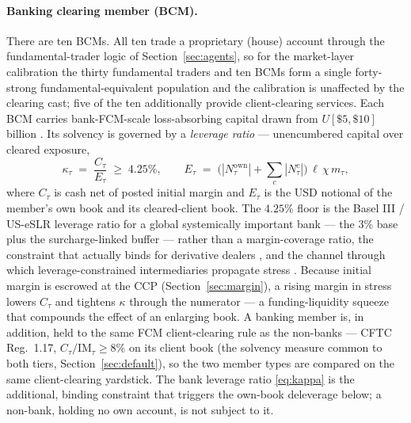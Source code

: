 \paragraph{Banking clearing member (BCM).}
There are ten BCMs. All ten trade a proprietary (house) account through the fundamental-trader
logic of Section~\ref{sec:agents}, so for the market-layer calibration the thirty fundamental
traders and ten BCMs form a single forty-strong fundamental-equivalent population and the
calibration is unaffected by the clearing cast; five of the ten additionally provide
client-clearing services. Each BCM carries bank-FCM-scale loss-absorbing capital drawn from
$U[\$5,\$10]$\,billion \citep{cftc_fcm}. Its solvency is governed by a \emph{leverage ratio} ---
unencumbered capital over cleared exposure,
\begin{equation}
\label{eq:kappa}
\kappa_\tau \;=\; \frac{C_\tau}{E_\tau} \;\ge\; 4.25\%,
\qquad
E_\tau \;=\; \bigl(|N^{\mathrm{own}}_\tau| + \textstyle\sum_c |N^{c}_\tau|\bigr)\,\ell\,\chi\,m_\tau,
\end{equation}
where $C_\tau$ is cash net of posted initial margin and $E_\tau$ is the USD notional of the
member's own book and its cleared-client book. The $4.25\%$ floor is the Basel III / US-eSLR
leverage ratio for a global systemically important bank --- the $3\%$ base plus the
surcharge-linked buffer --- rather than a margin-coverage ratio, the constraint that actually binds
for derivative dealers \citep{haynes_mcphail_zhu_2019,acosta_smith_2018}, and the channel through which
leverage-constrained intermediaries propagate stress \citep{thurner_2012,aymanns_farmer_2015}.
Because initial margin is escrowed at the CCP (Section~\ref{sec:margin}), a rising margin in stress
lowers $C_\tau$ and tightens $\kappa$ through the numerator --- a funding-liquidity squeeze that
compounds the effect of an enlarging book. A banking member is, in addition, held to the same FCM
client-clearing rule as the non-banks --- CFTC Reg.~1.17, $C_\tau/\mathrm{IM}_\tau \ge 8\%$ on its
client book (the solvency measure common to both tiers, Section~\ref{sec:default}), so the two member
types are compared on the same client-clearing yardstick. The bank leverage ratio
\eqref{eq:kappa} is the additional, binding constraint that triggers the own-book deleverage below;
a non-bank, holding no own account, is not subject to it.

